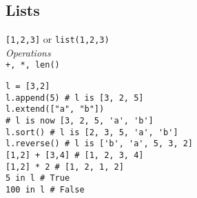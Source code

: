 \subsection{Lists}
\texttt{[1,2,3]} or \texttt{list(1,2,3)} \\
\textit{Operations} \\
\texttt{+, *, len()}

\begin{lstlisting}
l = [3,2]
l.append(5) # l is [3, 2, 5]
l.extend(["a", "b"]) 
# l is now [3, 2, 5, 'a', 'b']
l.sort() # l is [2, 3, 5, 'a', 'b']
l.reverse() # l is ['b', 'a', 5, 3, 2]
[1,2] + [3,4] # [1, 2, 3, 4]
[1,2] * 2 # [1, 2, 1, 2]
5 in l # True
100 in l # False
\end{lstlisting}
